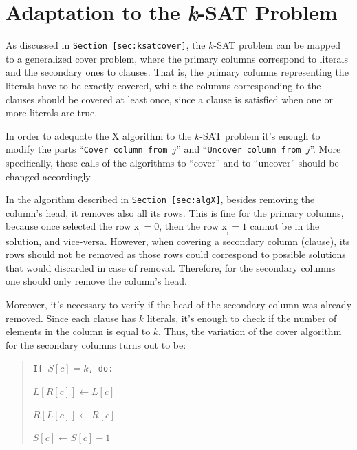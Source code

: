 \documentclass[12pt]{article}
\begin{document}
\linespread{1.5}



\section{Adaptation to the \emph{k}-SAT Problem}

As discussed in \texttt{Section \ref{sec:ksatcover}}, the $k$-SAT problem can be mapped to a generalized cover problem, where the primary columns correspond to literals and the secondary ones to clauses.
That is, the primary columns representing the literals have to be exactly covered, while the columns corresponding to the clauses should be covered at least once, since a clause is satisfied when one or more literals are true.

In order to adequate the X algorithm to the $k$-SAT problem it's enough to modify the parts ``\texttt{Cover column from $j$}'' and ``\texttt{Uncover column from $j$}''.
More specifically, these calls of the algorithms to ``cover'' and to ``uncover'' should be changed accordingly.

In the algorithm described in \texttt{Section \ref{sec:algX}}, besides removing the column's head, it removes also all its rows.
This is fine for the primary columns, because once selected the row $\mathrm{x_{_i} = 0}$, then the row $\mathrm{x_{_i} = 1}$ cannot be in the solution, and vice-versa.
However, when covering a secondary column (clause), its rows should not be removed as those rows could correspond to possible solutions that would discarded in case of removal.
Therefore, for the secondary columns one should only remove the column's head.

Moreover, it's necessary to verify if the head of the secondary column was already removed.
Since each clause has $k$ literals, it's enough to check if the number of elements in the column is equal to $k$.
Thus, the variation of the cover algorithm for the secondary columns turns out to be:
\\[-10pt]

\linespread{0.8}

{\small
  \begin{quote}
    \texttt{If $S{\left[ c \right]} = k$, do:}

       \hspace{0.5cm}\texttt{$L{\left[ R{\left[ c \right]} \right]} \leftarrow L{\left[ c \right]}$}

       \hspace{0.5cm}\texttt{$R{\left[ L{\left[ c \right]} \right]} \leftarrow R{\left[ c \right]}$}

    \texttt{$S{\left[ c \right]} \leftarrow S{\left[ c \right]} - 1$}
  \end{quote}
}
\end{document}
